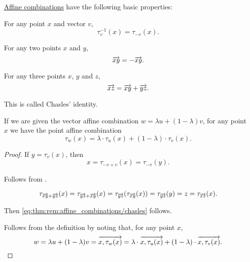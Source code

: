 \begin{proposition}\label{thm:rem:affine_combinations}
  \hyperref[rem:affine_combinations]{Affine combinations} have the following basic properties:
  \begin{thmenum}
     For any point \( x \) and vector \( v \),
    \begin{equation*}
      \tau_v^{-1}(x) = \tau_{-v}(x).
    \end{equation*}

     For any two points \( x \) and \( y \),
    \begin{equation*}
      \overrightarrow{xy} = -\overrightarrow{xy}.
    \end{equation*}

     For any three points \( x \), \( y \) and \( z \),
    \begin{equation}\label{eq:thm:rem:affine_combinations/chasles}
      \overrightarrow{xz} = \overrightarrow{xy} + \overrightarrow{yz}.
    \end{equation}

    This is called Chasles' identity.

     If we are given the vector affine combination \( w = \lambda u + (1 - \lambda) v \), for any point \( x \) we have the point affine combination
    \begin{equation*}
      \tau_w(x) = \lambda \cdot \tau_u(x) + (1 - \lambda) \cdot \tau_v(x).
    \end{equation*}
  \end{thmenum}
\end{proposition}
\begin{proof}
   If \( y = \tau_v(x) \), then
  \begin{equation*}
    x = \tau_{-v + v}(x) = \tau_{-v}(y).
  \end{equation*}

   Follows from .

  \begin{equation*}
    \tau_{\overrightarrow{xy} + \overrightarrow{yz}}(x)
    =
    \tau_{\overrightarrow{yz} + \overrightarrow{xy}}(x)
    =
    \tau_{\overrightarrow{yz}}(\tau_{\overrightarrow{xy}}(x))
    =
    \tau_{\overrightarrow{yz}}(y)
    =
    z
    =
    \tau_{\overrightarrow{xz}}(x).
  \end{equation*}

  Then \eqref{eq:thm:rem:affine_combinations/chasles} follows.

   Follows from the definition by noting that, for any point \( x \),
  \begin{equation*}
    w = \lambda u + (1 - \lambda) v
    =
    \overrightarrow{x, \tau_w(x)} = \lambda \cdot \overrightarrow{x, \tau_u(x)} + (1 - \lambda) \cdot \overrightarrow{x, \tau_v(x)}.
  \end{equation*}
\end{proof}

